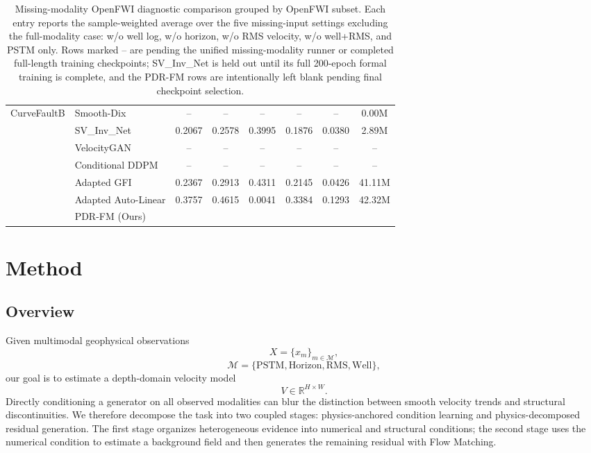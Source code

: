 \documentclass[letterpaper]{article}
\begin{document}
\begin{table}[t]
{\begin{tabular}{llcccccc}
\hline
CurveFaultB & Smooth-Dix & -- & -- & -- & -- & -- & 0.00M \\
 & SV\_Inv\_Net & 0.2067 & 0.2578 & 0.3995 & 0.1876 & 0.0380 & 2.89M \\
 & VelocityGAN & -- & -- & -- & -- & -- & -- \\
 & Conditional DDPM & -- & -- & -- & -- & -- & -- \\
 & Adapted GFI & 0.2367 & 0.2913 & 0.4311 & 0.2145 & 0.0426 & 41.11M \\
 & Adapted Auto-Linear & 0.3757 & 0.4615 & 0.0041 & 0.3384 & 0.1293 & 42.32M \\
 & PDR-FM (Ours) &  &  &  &  &  &  \\
\hline
\end{tabular}
}
\caption{Missing-modality OpenFWI diagnostic comparison grouped by OpenFWI subset. Each entry reports the sample-weighted average over the five missing-input settings excluding the full-modality case: w/o well log, w/o horizon, w/o RMS velocity, w/o well+RMS, and PSTM only. Rows marked -- are pending the unified missing-modality runner or completed full-length training checkpoints; SV\_Inv\_Net is held out until its full 200-epoch formal training is complete, and the PDR-FM rows are intentionally left blank pending final checkpoint selection.}
\label{tab:openfwi_missing_comparison}
\end{table}

\section{Method}

\subsection{Overview}
Given multimodal geophysical observations
\begin{equation}
X=\{x_m\}_{m\in\mathcal M},
\end{equation}
\begin{equation}
\mathcal M=\{\mathrm{PSTM},\mathrm{Horizon},\mathrm{RMS},\mathrm{Well}\},
\end{equation}
our goal is to estimate a depth-domain velocity model
\begin{equation}
V\in\mathbb R^{H\times W}.
\end{equation}
Directly conditioning a generator on all observed modalities can blur the distinction between smooth velocity trends and structural discontinuities. We therefore decompose the task into two coupled stages: physics-anchored condition learning and physics-decomposed residual generation. The first stage organizes heterogeneous evidence into numerical and structural conditions; the second stage uses the numerical condition to estimate a background field and then generates the remaining residual with Flow Matching.
\end{document}
